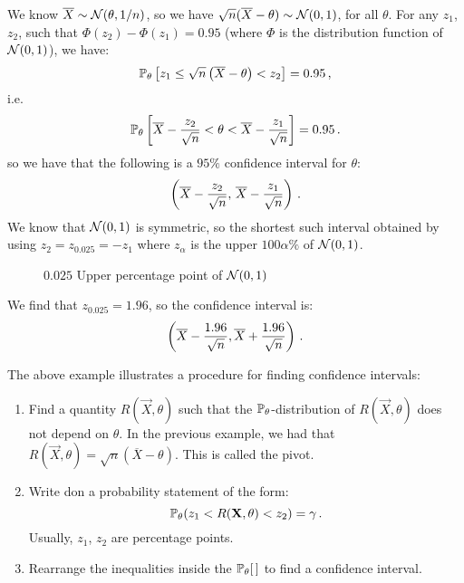 We know $\overline{X} \sim \mathcal{N}(\theta, 1/n)$, so we have $\sqrt{n}(\overline{X} - \theta) \sim \mathcal{N}(0, 1)$, for all $\theta$. For any $z_1$, $z_2$, such that $\Phi(z_2) - \Phi(z_1) = 0.95$ (where $\Phi$ is the distribution function of $\mathcal{N}(0, 1)$), we have:
\[
\mathbb{P}_\theta \left[ z_1 \leq \sqrt{n}\left(\overline{X} - \theta\right) < z_2 \right] = 0.95 \, {,}
\]
i.e.
\[
\mathbb{P}_\theta \left[ \overline{X} - \frac{z_2}{\sqrt{n}} < \theta < \overline{X} - \frac{z_1}{\sqrt{n}} \right] = 0.95 \, {.}
\]
so we have that the following is a $95\%$ confidence interval for $\theta$:
\[
\left( \overline{X} - \frac{z_2}{\sqrt{n}}, \, \overline{X} - \frac{z_1}{\sqrt{n}} \right) \, {.}
\]
We know that $\mathcal{N}(0, 1)$ is symmetric, so the shortest such interval obtained by using $z_2 = z_{0.025} = -z_1$ where $z_\alpha$ is the upper $100\alpha\%$ of $\mathcal{N}(0, 1)$.
\begin{figure}
  \centering


  \caption{$0.025$ Upper percentage point of $\mathcal{N}(0, 1)$}
  \label{fig:5.1}
\end{figure}
We find that $z_{0.025} = 1.96$, so the confidence interval is:
\[
\left(\overline{X} - \frac{1.96}{\sqrt{n}}, \overline{X} + \frac{1.96}{\sqrt{n}} \right) \, {.}
\]

The above example illustrates a procedure for finding confidence intervals:
\begin{enumerate}
\item Find a quantity $R(\vec{X}, \theta)$ such that the $\mathbb{P}_\theta$-distribution of $R(\vec{X}, \theta)$ does not depend on $\theta$. 
In the previous example, we had that $R(\vec{X}, \theta) = \sqrt{n}(\overline{X} - \theta)$. This is called the pivot.

\item Write don a probability statement of the form:
\[
\mathbb{P}_\theta(z_1 < R(\mathbf{X}, \theta) < z_2) = \gamma \, {.}
\]
Usually, $z_1$, $z_2$ are percentage points.

\item Rearrange the inequalities inside the $\mathbb{P}_\theta[ \, ]$ to find a confidence interval.
\end{enumerate}

